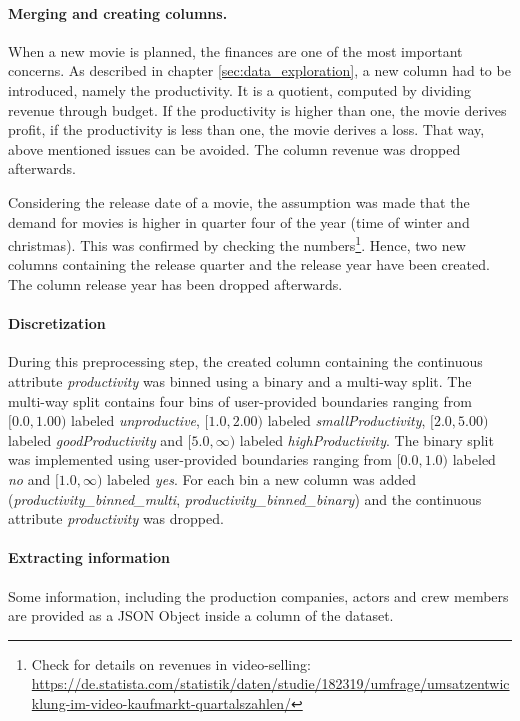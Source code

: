 \paragraph{Merging and creating columns.}
\label{sec:merge_create}
When a new movie is planned, the finances are one of the most important concerns. As described in chapter \ref{sec:data_exploration}, a new column had to be introduced, namely the productivity. It is a quotient, computed by dividing revenue through budget. If the productivity is higher than one, the movie derives profit, if the productivity is less than one, the movie derives a loss. That way, above mentioned issues can be avoided. The column revenue was dropped afterwards.

Considering the release date of a movie, the assumption was made that the demand for movies is higher in quarter four of the year (time of winter and christmas). This was confirmed by checking the numbers\footnote{Check for details on revenues in video-selling:\\ \hyperref{https://de.statista.com/statistik/daten/studie/182319/umfrage/umsatzentwicklung-im-video-kaufmarkt-quartalszahlen/}{link}{Statista revenue movies}{https://de.statista.com/statistik/daten/studie/182319/umfrage/umsatzentwicklung-im-video-kaufmarkt-quartalszahlen/}}. Hence, two new columns containing the release quarter and the release year have been created. The column release year has been dropped afterwards.

\paragraph{Discretization}
During this preprocessing step, the created column containing the continuous attribute \textit{productivity} was binned using a binary and a multi-way split. The multi-way split contains four bins of user-provided boundaries ranging from $[0.0, 1.00)$ labeled \textit{unproductive}, $[1.0, 2.00)$ labeled \textit{smallProductivity}, $[2.0, 5.00)$ labeled \textit{goodProductivity} and $[5.0, \infty)$ labeled \textit{highProductivity}. The binary split was implemented using user-provided boundaries ranging from $[0.0, 1.0)$ labeled \textit{no} and $[1.0, \infty)$ labeled \textit{yes}. For each bin a new column was added (\textit{productivity\_binned\_multi}, \textit{productivity\_binned\_binary}) and the continuous attribute \textit{productivity} was dropped.

\paragraph{Extracting information}
Some information, including the production companies, actors and crew members are provided as a JSON Object inside a column of the dataset. 

